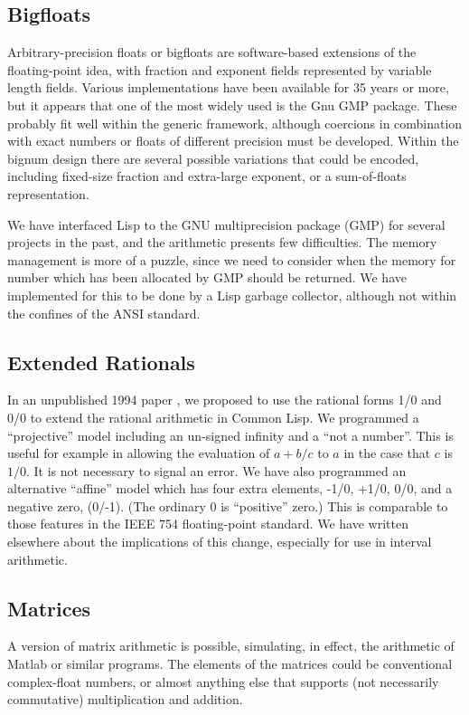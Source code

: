 \documentclass{article}
\begin{document}
{{\subsection*{Bigfloats}
Arbitrary-precision floats or bigfloats are software-based extensions
of the floating-point idea, with fraction and exponent fields represented by
variable length fields. Various implementations
have been available for 35 years or more, but it appears that
one of the most widely used is the Gnu GMP package. These probably
fit well within the generic framework, although coercions in combination
with exact numbers or floats of different precision must be developed.
Within the bignum design there are several possible variations that
could be encoded, including fixed-size fraction and extra-large
exponent, or a sum-of-floats representation.

We have interfaced Lisp to the GNU multiprecision package (GMP) for
several projects in the past, and the arithmetic presents few
difficulties. The memory management is more of a puzzle, since we need
to consider when the memory for number which has been allocated by GMP
should be returned. We have implemented for this to be done by a Lisp
garbage collector, although not within the confines of the ANSI
standard.
\subsection*{Extended Rationals}
In an unpublished 1994 paper \cite{extrat}, we proposed to use the rational
forms 1/0 and 0/0 to extend the rational arithmetic in Common
Lisp. We programmed a ``projective''  model including an un-signed infinity and 
a ``not a number''. This is useful for example in
allowing the evaluation of $a+b/c$ to $a$ in the case that $c$ is $1/0$.
It is not necessary to signal an error. We have also programmed
an alternative ``affine''
model which has four extra elements, -1/0, +1/0, 0/0, and a negative zero, (0/-1).
(The ordinary 0 is ``positive'' zero.)
This is comparable to those features in the IEEE 754 floating-point
standard. We have written elsewhere \cite{extrat} about the implications of 
this change, especially for use in interval arithmetic.

\subsection*{Matrices}
A version of matrix arithmetic is possible, simulating, in effect,
the arithmetic of Matlab or similar programs. The elements of the
matrices could be conventional complex-float numbers, or almost
anything else that supports (not necessarily commutative) multiplication
and addition. 
}}
\end{document}
